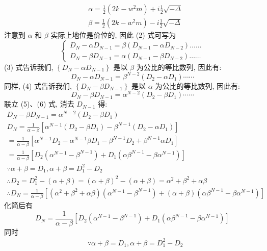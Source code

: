 \documentclass[11pt, a4paper, oneside]{ctexart}
\begin{document}
{{{\begin{appendices}
{$$
\begin{aligned}
&\alpha=\frac{1}{2}\left(2 k-w^{2} m\right)+i \frac{1}{2} \sqrt{-\Delta} \\
&\beta=\frac{1}{2}\left(2 k-w^{2} m\right)-i \frac{1}{2} \sqrt{-\Delta}
\end{aligned}
$$
注意到 $\alpha$ 和 $\beta$ 实际上地位是价位的, 因此 (2) 式可写为
$$
\left\{\begin{array}{l}
D_{N}-\alpha D_{N-1}=\beta\left(D_{N-1}-\alpha D_{N-2}\right) \ldots \ldots \\
D_{N}-\beta D_{N-1}=\alpha\left(D_{N-1}-\beta D_{N-2}\right) \ldots \ldots
\end{array}\right.
$$
(3) 式告诉我们, $\left\{D_{N}-\alpha D_{N-1}\right\}$ 是以 $\beta$ 为公比的等比数列, 因此有:
$$
D_{N}-\alpha D_{N-1}=\beta^{N-2}\left(D_{2}-\alpha D_{1}\right) \cdots \cdots
$$
同样, (4) 式告诉我们, $\left\{D_{N}-\beta D_{N-1}\right\}$ 是以 $\alpha$ 为公比的等比数列, 因此有:
$$
D_{N}-\beta D_{N-1}=\alpha^{N-2}\left(D_{2}-\beta D_{1}\right) \cdots \cdots
$$
联立 (5)、(6) 式, 消去 $D_{N-1}$ 得:
$$
\begin{gathered}
D_{N}-\beta D_{N-1}=\alpha^{N-2}\left(D_{2}-\beta D_{1}\right) \\
D_{N}=\frac{1}{\alpha-\beta}\left[\alpha^{N-1}\left(D_{2}-\beta D_{1}\right)-\beta^{N-1}\left(D_{2}-\alpha D_{1}\right)\right] \\
=\frac{1}{\alpha-\beta}\left[\alpha^{N-1} D_{2}-\alpha^{N-1} \beta D_{1}-\beta^{N-1} D_{2}+\beta^{N-1} \alpha D_{1}\right] \\
=\frac{1}{\alpha-\beta}\left[D_{2}\left(\alpha^{N-1}-\beta^{N-1}\right)+D_{1}\left(\alpha \beta^{N-1}-\beta \alpha^{N-1}\right)\right] \\
\because \alpha+\beta=D_{1}, \alpha+\beta=D_{1}^{2}-D_{2} \\
\therefore D_{2}=D_{1}^{2}-(\alpha+\beta)=(\alpha+\beta)^{2}-(\alpha+\beta)=\alpha^{2}+\beta^{2}+\alpha \beta \\
\therefore D_{N}=\frac{1}{\alpha-\beta}\left[\left(\alpha^{2}+\beta^{2}+\alpha \beta\right)\left(\alpha^{N-1}-\beta^{N-1}\right)+(\alpha+\beta)\left(\alpha \beta^{N-1}-\beta \alpha^{N-1}\right)\right]
\end{gathered}
$$
化简后有
$$
D_N=\frac{1}{\alpha-\beta}\left[D_{2}\left(\alpha^{N-1}-\beta^{N-1}\right)+D_{1}\left(\alpha \beta^{N-1}-\beta \alpha^{N-1}\right)\right]
$$
同时
$$
\begin{aligned}
&\because \alpha+\beta=D_{1}, \alpha+\beta=D_{1}^{2}-D_{2} \\

\end{aligned}$$}
\end{appendices}}}}
\end{document}
